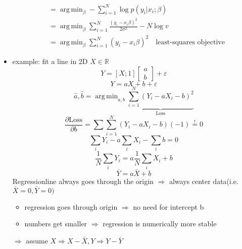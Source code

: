 \documentclass[11pt]{article}
\DeclareMathOperator*{\argmin}{arg\,min}
\begin{document}
\begin{itemize}
\begin{equation*}
\begin{align*}
             \\
            &= \argmin_{\beta} - \sum_{i=1}^N \log p(y_i|x_i; \beta) \\
            &= \argmin_{\beta} \sum_{i=1}^N \frac{(y_i-x_i\beta)^2}{2\sigma^2} -
            N \log v \\
            &= \argmin_{\beta} \sum_{i=1}^N (y_i-x_i\beta)^2 \quad \text{least-squares objective}
          \end{align*}
        \end{equation*}
        \item example: fit a line in 2D $X \in \mathbb{R}$
        \begin{equation*}
          Y = [X;1]
          \left[ \begin{array}{c}
          a \\
          b
          \end{array}\right] + \varepsilon
        \end{equation*}
        \begin{equation*}
          Y = aX + b + \varepsilon
        \end{equation*}
        \begin{equation*}
          \hat{a}, \hat{b} = \argmin_{a,b} \underbrace{\sum_{i=1}^N (Y_i-aX_i-b)^2}_{
          \text{Loss}}
        \end{equation*}
        \begin{equation*}
          \frac{\partial \text{Loss}}{\partial b} = \sum \sum_{i=1}^N (Y_i-aX_i-b)
          (-1)\overset{!}{=}0
        \end{equation*}
        \begin{equation*}
          \sum_iY_i-a\sum_iX_i-\sum_ib=0
        \end{equation*}
        \begin{equation*}
          \frac{1}{N}\sum_iY_i=a\frac{1}{N}\sum_iX_i+b
        \end{equation*}
        \begin{equation*}
          \bar{Y} = a\bar{X}+b
        \end{equation*}
        Regressionline always goes through the origin
        $\Rightarrow$ always center data(i.e. $\bar{X}=0, \bar{Y}=0)$
        \begin{itemize}
          \item regression goes through origin $\Rightarrow$ no need for
          intercept b
          \item numbers get smaller $\Rightarrow$ regression is numerically more stable
        \end{itemize}
        $\Rightarrow$ assume $X \Rightarrow X-\bar{X}, Y \Rightarrow Y-\bar{Y}$
      \end{itemize}
\end{document}
